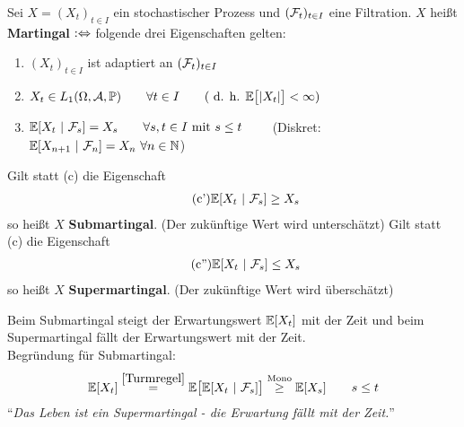 \begin{defi}[Martingal]\enter
	Sei $X=(X_t)_{t\in I}$ ein stochastischer Prozess und $(\mathcal{F}_t)_{t\in I}$ eine Filtration.
	$X$ heißt \textbf{Martingal} $:\Leftrightarrow$ folgende drei 	Eigenschaften gelten:
	\begin{enumerate}[label=(\alph*)]
		\item $(X_t)_{t\in I}$ ist adaptiert an $(\mathcal{F}_t)_{t\in I}$
		\item $\begin{aligned}
			X_t\in L_1(\Omega,\mathcal{A},\mathbb{P}) \qquad \forall t\in I\qquad(\text{ d. h. } \mathbb{E}\big[|X_t|\big]<\infty)
		\end{aligned}$
		\item $\begin{aligned}
			\mathbb{E}[X_t~|~\mathcal{F}_s]=X_s\qquad\forall s,t\in I\text{ mit } s\leq t
		\end{aligned}\qquad$ (Diskret:
		$ \mathbb{E}[X_{n+1}~|~\mathcal{F}_n]=X_n~\forall n\in\mathbb{N}$) 
	\end{enumerate}
	Gilt statt (c) die Eigenschaft
	\begin{align}\label{defSubmartingal}\tag{c'}
		\mathbb{E}[X_t~|~\mathcal{F}_s]\geq X_s
	\end{align}
	so heißt $X$ \textbf{Submartingal}. (Der zukünftige Wert wird unterschätzt) \enter Gilt statt (c) die Eigenschaft
	\begin{align}\label{defSupermartingal}\tag{c''}
		\mathbb{E}[X_t~|~\mathcal{F}_s]\leq X_s
	\end{align}
	so heißt $X$ \textbf{Supermartingal}. (Der zukünftige Wert wird überschätzt)
\end{defi}

\begin{bemerkung}
	Beim Submartingal steigt der Erwartungswert $\mathbb{E}[X_t]$ mit der Zeit und beim Supermartingal fällt der Erwartungswert mit der Zeit.\\
	Begründung für Submartingal:
	\begin{align*}
		\mathbb{E}[X_t]\stackrel{\eqref{Turmregel}}{=}
		\mathbb{E}\big[\mathbb{E}[X_t~|~\mathcal{F}_s]\big]\stackrel{\text{Mono}}{\geq}\mathbb{E}[X_s]\qquad s\leq t
	\end{align*}
	``\textit{Das Leben ist ein Supermartingal - die Erwartung fällt mit der Zeit.}''
\end{bemerkung}

